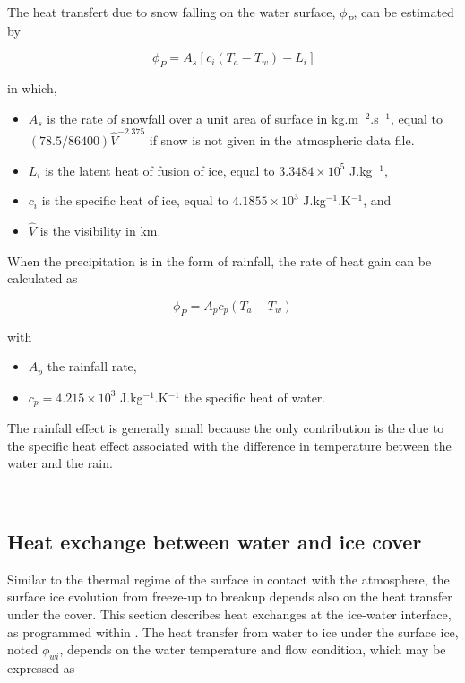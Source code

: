 The heat transfert due to snow falling on the water surface, $\phi_P$, can be estimated by

\begin{equation} \label{eq:phip}
\phi_P = A_s\ \Big[\ c_i( T_a-T_w ) -L_i \ \Big]
\end{equation}

in which,
\begin{itemize}
	\item $A_s$ is the rate of snowfall over a unit area of surface in kg.m$^{-2}$.s$^{-1}$, equal to $(78.5/86400)\hat{V}^{-2.375}$ if snow is not given in the atmospheric data file.
	\item $L_i$ is the latent heat of fusion of ice, equal to $3.3484 \times 10^5$ J.kg$^{-1}$,
	\item $c_i$ is the specific heat of ice, equal to $4.1855\times10^3$ J.kg$^{-1}$.K$^{-1}$, and
	\item $\hat{V}$ is the visibility in km.
\end{itemize}

When the precipitation is in the form of rainfall, the rate of heat gain can be calculated as

\begin{equation} \label{eq:phipbis}
\phi_P=A_p c_p(T_a-T_w)
\end{equation}

with

\begin{itemize}
	\item $A_p$ the rainfall rate,
	\item $c_p=4.215\times10^3$ J.kg$^{-1}$.K$^{-1}$ the specific heat of water.
\end{itemize}

The rainfall effect is generally small because the only contribution is the due to the specific heat effect associated with the difference in temperature between the water and the rain.

~\newline
\subsection{Heat exchange between water and ice cover}
\label{heat_exchanges_icover_and_water}

Similar to the thermal regime of the surface in contact with the atmosphere, the surface ice evolution from freeze-up to breakup depends also on the heat transfer under the cover. This section describes heat exchanges at the ice-water interface, as programmed within \khione.
The heat transfer from water to ice under the surface ice, noted $\phi_{wi}$, depends on the water temperature and flow condition, which may be expressed as

